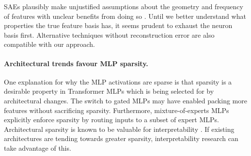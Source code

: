 \documentclass{article}
\theoremstyle{plain}
\theoremstyle{definition}
\theoremstyle{remark}
\begin{document}
SAEs plausibly make unjustified assumptions about the geometry and frequency of features \citep{hindupur2025projecting,chanin2025absorption} with unclear benefits from doing so \citep{wu2025axbench,kantamneni2025sparse}. Until we better understand what properties the true feature basis has, it seems prudent to exhaust the neuron basis first. Alternative techniques without reconstruction error \citep{shafran2025decomposing} are also compatible with our approach.


\paragraph{Architectural trends favour MLP sparsity.} One explanation for why the MLP activations are sparse is that sparsity is a desirable property in Transformer MLPs which is being selected for by architectural changes. The switch to gated MLPs
may have enabled packing more features without sacrificing sparsity. Furthermore, mixture-of-experts MLPs explicitly enforce sparsity by routing inputs to a subset of expert MLPs. Architectural sparsity is known to be valuable for interpretability \citep{gao2025weight}. If existing architectures are tending towards greater sparsity, interpretability research can take advantage of this.
\end{document}
